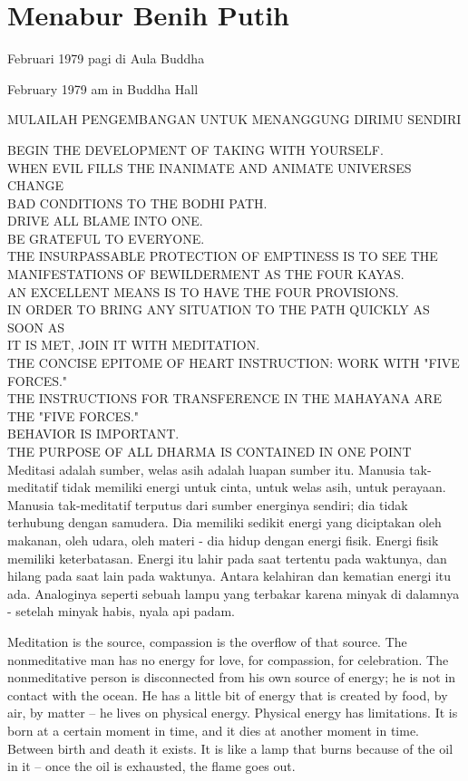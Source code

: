 \chapter{Menabur Benih Putih} %

 Februari 1979 pagi di Aula Buddha

 February 1979 am in Buddha Hall

\bahasa
MULAILAH PENGEMBANGAN UNTUK MENANGGUNG DIRIMU SENDIRI

\english
BEGIN THE DEVELOPMENT OF TAKING WITH YOURSELF. \\
WHEN EVIL FILLS THE INANIMATE AND ANIMATE UNIVERSES CHANGE \\
BAD CONDITIONS TO THE BODHI PATH. \\
DRIVE ALL BLAME INTO ONE. \\
BE GRATEFUL TO EVERYONE. \\
THE INSURPASSABLE PROTECTION OF EMPTINESS IS TO SEE THE \\
MANIFESTATIONS OF BEWILDERMENT AS THE FOUR KAYAS. \\
AN EXCELLENT MEANS IS TO HAVE THE FOUR PROVISIONS. \\
IN ORDER TO BRING ANY SITUATION TO THE PATH QUICKLY AS SOON AS \\
IT IS MET, JOIN IT WITH MEDITATION. \\
THE CONCISE EPITOME OF HEART INSTRUCTION: WORK WITH "FIVE FORCES." \\
THE INSTRUCTIONS FOR TRANSFERENCE IN THE MAHAYANA ARE THE "FIVE FORCES." \\
BEHAVIOR IS IMPORTANT. \\
THE PURPOSE OF ALL DHARMA IS CONTAINED IN ONE POINT \\

\bahasa
Meditasi adalah sumber, welas asih adalah luapan sumber itu. Manusia tak-meditatif tidak memiliki energi untuk cinta, untuk welas asih, untuk perayaan. Manusia tak-meditatif terputus dari sumber energinya sendiri; dia tidak terhubung dengan samudera. Dia memiliki sedikit energi yang diciptakan oleh makanan, oleh udara, oleh materi - dia hidup dengan energi fisik. Energi fisik memiliki keterbatasan. Energi itu lahir pada saat tertentu pada waktunya, dan hilang pada saat lain pada waktunya. Antara kelahiran dan kematian energi itu ada. Analoginya seperti sebuah lampu yang terbakar karena minyak di dalamnya - setelah minyak habis, nyala api padam.

\english
Meditation is the source, compassion is the overflow of that source. The nonmeditative man has no energy for love, for compassion, for celebration. The nonmeditative person is disconnected from his own source of energy; he is not in contact with the ocean. He has a little bit of energy that is created by food, by air, by matter -- he lives on physical energy. Physical energy has limitations. It is born at a certain moment in time, and it dies at another moment in time. Between birth and death it exists. It is like a lamp that burns because of the oil in it -- once the oil is exhausted, the flame goes out.

\bahasa

\english

